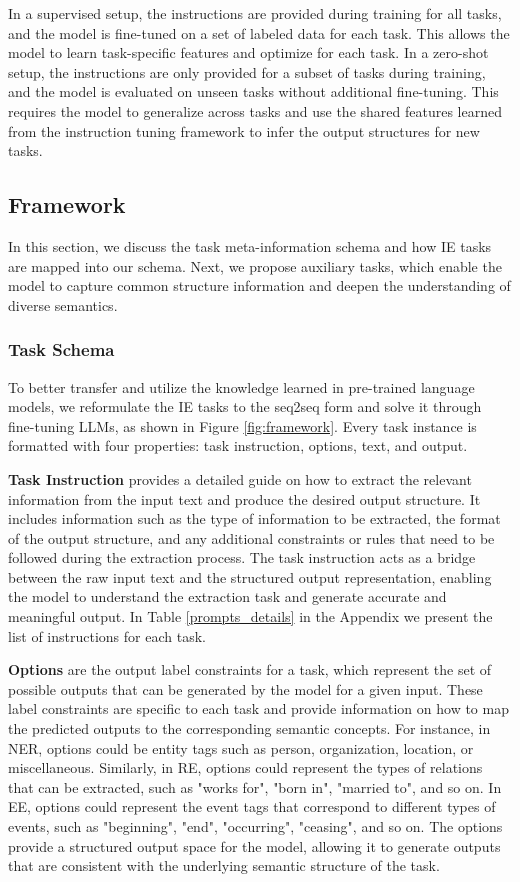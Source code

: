 \documentclass[11pt]{article}
\begin{document}
In a supervised setup, the instructions are provided during training for all tasks, and the model is fine-tuned on a set of labeled data for each task. This allows the model to learn task-specific features and optimize for each task. In a zero-shot setup, the instructions are only provided for a subset of tasks during training, and the model is evaluated on unseen tasks without additional fine-tuning. This requires the model to generalize across tasks and use the shared features learned from the instruction tuning framework to infer the output structures for new tasks.

\subsection{Framework}
In this section, we discuss the task meta-information schema and how IE tasks are mapped into our schema. 
Next, we propose auxiliary tasks, which enable the model to capture common structure information and deepen the understanding of diverse semantics.

\subsubsection{Task Schema}\label{task schema}
To better transfer and utilize the knowledge learned in pre-trained language models, we reformulate the IE tasks to the seq2seq form and solve it through fine-tuning LLMs, as shown in Figure \ref{fig:framework}. Every task instance is formatted with four properties: task instruction, options, text, and output.


\textbf{Task Instruction} provides a detailed guide on how to extract the relevant information from the input text and produce the desired output structure. It includes information such as the type of information to be extracted, the format of the output structure, and any additional constraints or rules that need to be followed during the extraction process. The task instruction acts as a bridge between the raw input text and the structured output representation, enabling the model to understand the extraction task and generate accurate and meaningful output. In Table \ref{prompts_details} in the Appendix we present the list of instructions for each task.

\textbf{Options} are the output label constraints for a task, which represent the set of possible outputs that can be generated by the model for a given input. These label constraints are specific to each task and provide information on how to map the predicted outputs to the corresponding semantic concepts. For instance, in NER, options could be entity tags such as person, organization, location, or miscellaneous. Similarly, in RE, options could represent the types of relations that can be extracted, such as "works for", "born in", "married to", and so on. In EE, options could represent the event tags that correspond to different types of events, such as "beginning", "end", "occurring", "ceasing", and so on. The options provide a structured output space for the model, allowing it to generate outputs that are consistent with the underlying semantic structure of the task.
\end{document}
